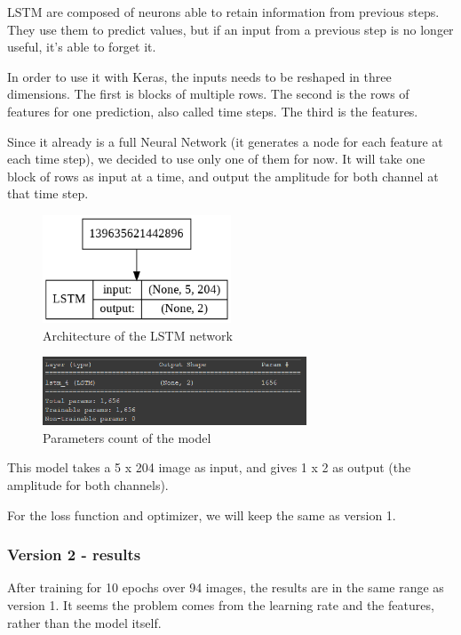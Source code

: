 \documentclass[12pt, twoside]{article}
\begin{document}
LSTM are composed of neurons able to retain information from previous steps. They use them to predict values, but if an input from a previous step is no longer useful, it's able to forget it.

In order to use it with Keras, the inputs needs to be reshaped in three dimensions. The first is blocks of multiple rows. The second is the rows of features for one prediction, also called time steps. The third is the features.


Since it already is a full Neural Network (it generates a node for each feature at each time step), we decided to use only one of them for now. It will take one block of rows as input at a time, and output the amplitude for both channel at that time step.

\begin{figure}
	\centering
	\includegraphics[width=0.5\textwidth]{../images/model_v2.png}
	\caption{Architecture of the LSTM network}
	\label{archiv2}
\end{figure}

\begin{figure}
	\centering
	\includegraphics[width=0.7\textwidth]{../images/model_v2_params.png}
	\caption{Parameters count of the model}
	\label{paramv2}
\end{figure}

This model takes a 5 x 204 image as input, and gives 1 x 2 as output (the amplitude for both channels).

For the loss function and optimizer, we will keep the same as version 1.

\subsubsection{Version 2 - results}
After training for 10 epochs over 94 images, the results are in the same range as version 1. It seems the problem comes from the learning rate and the features, rather than the model itself.
\end{document}
